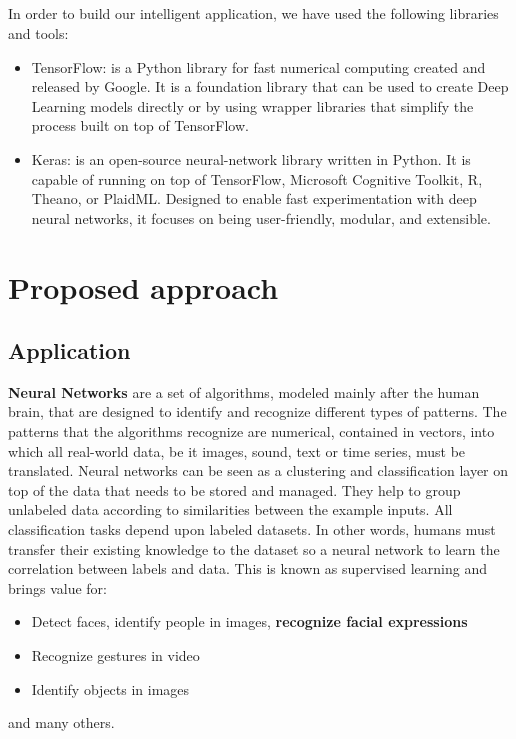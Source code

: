 \documentclass[runningheads,a4paper,11pt]{report}
\begin{document}
\paragraph{}
In order to build our intelligent application, we have used the following libraries and tools:
\begin{itemize}
  \item TensorFlow: is a Python library for fast numerical computing created and released by Google. It is a foundation library that can be used to create Deep Learning models directly or by using wrapper libraries that simplify the process built on top of TensorFlow. \cite{tensorflow}
  \item Keras: is an open-source neural-network library written in Python. It is capable of running on top of TensorFlow, Microsoft Cognitive Toolkit, R, Theano, or PlaidML. Designed to enable fast experimentation with deep neural networks, it focuses on being user-friendly, modular, and extensible.\cite{keras}
\end{itemize}














\chapter{Proposed approach}
\label{chapter:proposedApproach}

\section{Application}
\label{section:application}

\textbf{Neural Networks} are a set of algorithms, modeled mainly after the human brain, that are designed to identify and recognize different types of patterns. The patterns that the algorithms recognize are numerical, contained in vectors, into which all real-world data, be it images, sound, text or time series, must be translated.
Neural networks can be seen as a clustering and classification layer on top of the data that needs to be stored and managed. They help to group unlabeled data according to similarities between the example inputs.
All classification tasks depend upon labeled datasets. In other words, humans must transfer their existing knowledge to the dataset so a neural network to learn the correlation between labels and data. This is known as supervised learning and brings value for:
\begin{itemize}
	\item Detect faces, identify people in images, \textbf{recognize facial expressions}
	\item Recognize gestures in video
	\item Identify objects in images
\end{itemize} and many others.\cite{skymindneural}
\end{document}
